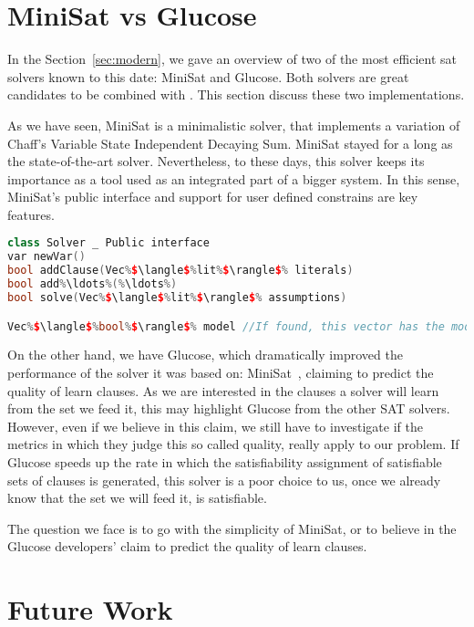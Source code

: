\section{MiniSat vs Glucose}
In the Section~\ref{sec:modern}, we gave an overview of two of the most
efficient sat solvers known to this date: MiniSat and Glucose. Both solvers are
great candidates to be combined with \ksp. This section discuss these two
implementations. 

As we have seen, MiniSat is a minimalistic solver, that implements a variation
of Chaff's Variable State Independent Decaying Sum. MiniSat stayed for a long as
the state-of-the-art solver. Nevertheless, to these days, this solver keeps its
importance as a tool used as an integrated part of a bigger system. In this
sense, MiniSat's public interface and support for user defined constrains are
key features.

\begin{lstlisting}[frame=single, language=C++,morekeywords={var,Solver,Vec,lit},escapechar=\%,commentstyle=\color{gray}]
class Solver _ Public interface
var newVar()
bool addClause(Vec%$\langle$%lit%$\rangle$% literals)
bool add%\ldots%(%\ldots%)
bool solve(Vec%$\langle$%lit%$\rangle$% assumptions)

Vec%$\langle$%bool%$\rangle$% model //If found, this vector has the model
\end{lstlisting}

On the other hand, we have Glucose, which dramatically improved the performance
of the solver it was based on: MiniSat~\cite{glucose}, claiming to predict the
quality of learn clauses. As we are interested in the clauses a solver will
learn from the set we feed it, this may highlight Glucose from the other SAT
solvers. However, even if we believe in this claim, we still have to
investigate if the metrics in which they judge this so called quality, really
apply to our problem. If Glucose speeds up the rate in which the satisfiability
assignment of satisfiable sets of clauses is generated, this solver is a poor
choice to us, once we already know that the set we will feed it, is satisfiable.

The question we face is to go with the simplicity of MiniSat, or to believe in
the Glucose developers' claim to predict the quality of learn clauses.

\section{Future Work}
